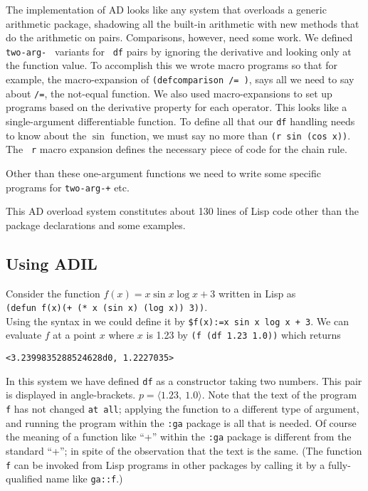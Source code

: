 \documentclass{article}
\begin{document}
{The implementation of AD looks like any system that overloads
a generic arithmetic package, shadowing all the built-in arithmetic
with new methods that do the arithmetic on pairs. Comparisons,
however, need some work. We defined {\tt two-arg- } variants for {\tt
df} pairs by ignoring the derivative and looking only at the function
value.  To accomplish this we wrote macro programs so that for
example, the macro-expansion of {\tt (defcomparison /= )}, says all we
need to say about {\tt /=}, the not-equal function. We also used
macro-expansions to set up programs based on the derivative property
for each operator. This looks like a single-argument differentiable
function.  To define all that our {\tt df} handling needs to know
about the $\sin$ function, we must say
no more than {\tt (r sin (cos x))}. The {\tt
r} macro expansion defines the necessary piece of code for the chain
rule.

Other than these one-argument functions we need to write some specific programs for 
{\tt two-arg-+}  etc. 

This AD overload system constitutes about 130 lines of Lisp code other than the
package declarations and some examples.

\subsection{Using ADIL}

Consider the function $f(x)=x  \sin x  \log x + 3$
written in Lisp as\\
 {\tt (defun f(x)(+ (* x (sin x) (log x)) 3))}.\\
Using the syntax in \cite{basol} we could define it by
{\tt \$f(x):=x sin x log x + 3}.
We can evaluate $f$ at a point $x$ where $x$ is 1.23 by
{\tt (f (df 1.23 1.0))} which returns
\begin{verbatim}
<3.2399835288524628d0, 1.2227035>
\end{verbatim}
In this system we have defined {\tt df} as a constructor taking two numbers.
This pair is displayed in angle-brackets.
$p=\langle 1.23,~1.0 \rangle$.
Note that the text of the program {\tt f} has not changed {\tt at all}; 
applying the function to a different type of argument, and running the
program within the {\tt :ga} package is all that is needed.
Of course the meaning of a function like ``+'' within the {\tt :ga}
package is different from the standard ``+'';
in spite of the observation that the text is the same.  (The function {\tt f} can be
invoked from Lisp programs in other packages by calling it by
a fully-qualified name like {\tt ga::f}.)
\medskip

}
\end{document}
